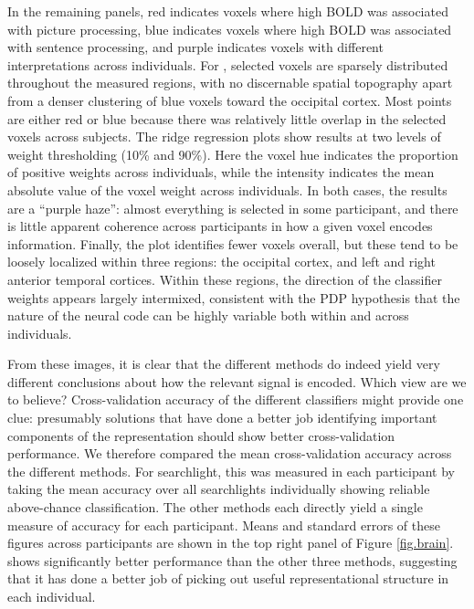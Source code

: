 In the remaining panels, red indicates voxels where high BOLD was associated with picture processing, blue indicates voxels where high BOLD was associated with sentence processing, and purple indicates voxels with different interpretations across individuals. For {\lasso}, selected voxels are sparsely distributed throughout the measured regions, with no discernable spatial topography apart from a denser clustering of blue voxels toward the occipital cortex. Most points are either red or blue because there was relatively little overlap in the selected voxels across subjects. The ridge regression plots show results at two levels of weight thresholding (10\% and 90\%). Here the voxel hue indicates the proportion of positive weights across individuals, while the intensity indicates the mean absolute value of the voxel weight across individuals. In both cases, the results are a ``purple haze'': almost everything is selected in some participant, and there is little apparent coherence across participants in how a given voxel encodes information. Finally, the {\soslasso} plot identifies fewer voxels overall, but these tend to be loosely localized within three regions: the occipital cortex, and left and right anterior temporal cortices. Within these regions, the direction of the classifier weights appears largely intermixed, consistent with the PDP hypothesis that the nature of the neural code can be highly variable both within and across individuals.

From these images, it is clear that the different methods do indeed yield very different conclusions about how the relevant signal is encoded. Which view are we to believe? Cross-validation accuracy of the different classifiers might provide one clue: presumably solutions that have done a better job identifying important components of the representation should show better cross-validation performance. We therefore compared the mean cross-validation accuracy across the different methods. For searchlight, this was measured in each participant by taking the mean accuracy over all searchlights individually showing reliable above-chance classification. The other methods each directly yield a single measure of accuracy for each participant. Means and standard errors of these figures across participants are shown in the top right panel of Figure \ref{fig.brain}. {\soslasso} shows significantly better performance than the other three methods, suggesting that it has done a better job of picking out useful representational structure in each individual.

